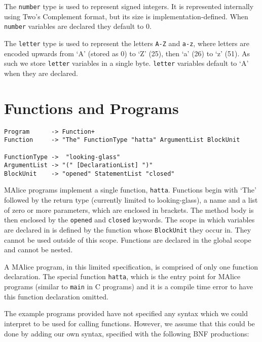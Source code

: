 \documentclass[a4wide, 11pt]{article}
\begin{document}
The \texttt{number} type is used to represent signed integers. It is represented internally using Two's Complement format, but its size is implementation-defined. When \texttt{number} variables are declared they default to 0.

The \texttt{letter} type is used to represent the letters \texttt{A-Z} and \texttt{a-z}, where letters are encoded upwards from `A' (stored as 0) to `Z' (25), then `a' (26) to `z' (51). As such we store \texttt{letter} variables in a single byte. \texttt{letter} variables default to `A' when they are declared.

\section{Functions and Programs}

\begin{verbatim}
Program      -> Function+
Function     -> "The" FunctionType "hatta" ArgumentList BlockUnit

FunctionType ->  "looking-glass"
ArgumentList -> "(" [DeclarationList] ")"
BlockUnit    -> "opened" StatementList "closed"
\end{verbatim}

MAlice programs implement a single function, \texttt{hatta}. Functions begin with `The' followed by the return type (currently limited to looking-glass), a name and a list of zero or more parameters, which are enclosed in brackets. The method body is then enclosed by the \texttt{opened} and \texttt{closed} keywords. The scope in which variables are declared in is defined by the function whose \texttt{BlockUnit} they occur in. They cannot be used outside of this scope. Functions are declared in the global scope and cannot be nested. 




A MAlice program, in this limited specification, is comprised of only one function declaration. The special function \texttt{hatta}, which  is the entry point for MAlice programs (similar to \texttt{main} in C programs) and it is a compile time error to have this function declaration omitted.

The example programs provided have not specified any syntax which we could interpret to be used for calling functions. However, we assume that this could be done by adding our own syntax, specified with the following BNF productions:
\end{document}
